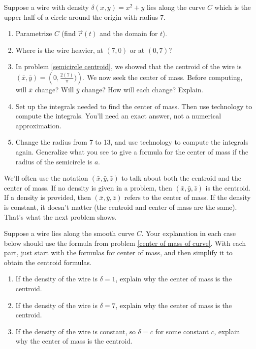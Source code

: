 \begin{problem}
%
Suppose a wire with density $\delta(x,y)=x^2+y$ lies along the curve $C$ which is the upper half of a circle around the origin with radius $7$.
\begin{enumerate}
\item Parametrize $C$ (find $\vec r(t)$ and the domain for $t$).
 \item Where is the wire heavier, at $(7,0)$ or at $(0,7)$?
 \item In problem \ref{semicircle centroid}, we showed that the centroid of the wire is $(\bar x, \bar y) = \left(0,\frac{2(7)}{\pi})\right)$.  We now seek the center of mass. Before computing, will $\bar x$ change?  Will $\bar y$ change?  How will each change? Explain.
 \item Set up the integrals needed to find the center of mass. Then use technology to compute the integrals. You'll need an exact answer, not a numerical approximation.
 \item Change the radius from 7 to 13, and use technology to compute the integrals again.  Generalize what you see to give a formula for the center of mass if the radius of the semicircle is $a$.
\end{enumerate}
\end{problem}

We'll often use the notation $(\bar x, \bar y,\bar z)$ to talk about both the centroid and the center of mass. If no density is given in a problem, then $(\bar x, \bar y,\bar z)$ is the centroid. If a density is provided, then $(\bar x, \bar y,\bar z)$ refers to the center of mass. If the density is constant, it doesn't matter (the centroid and center of mass are the same). That's what the next problem shows.

\begin{problem}
 Suppose a wire lies along the smooth curve $C$. Your explanation in each case below should use the formula from problem \ref{center of mass of curve}. With each part, just start with the formulas for center of mass, and then simplify it to obtain the centroid formulas.
\begin{enumerate}
 \item If the density of the wire is $\delta =1$, explain why the center of mass is the centroid. 
 \item If the density of the wire is $\delta =7$, explain why the center of mass is the centroid.
 \item If the density of the wire is constant, so $\delta =c$ for some constant $c$, explain why the center of mass is the centroid.
\end{enumerate}
\end{problem}

